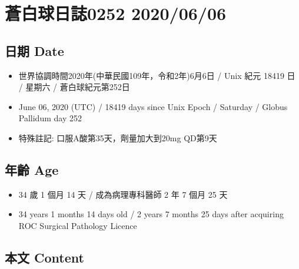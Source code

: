 \documentclass[a5paper, 11pt
]{book}
\providecommand{\tightlist}{%
  \setlength{\itemsep}{0pt}\setlength{\parskip}{0pt}}
\begin{document}
\hypertarget{ux84bcux767dux7403ux65e5ux8a8c0252-20200606}{%
\section{蒼白球日誌0252
2020/06/06}\label{ux84bcux767dux7403ux65e5ux8a8c0252-20200606}}

\hypertarget{ux65e5ux671f-date-5}{%
\subsection{日期 Date}\label{ux65e5ux671f-date-5}}

\begin{itemize}
\tightlist
\item
  世界協調時間2020年(中華民國109年，令和2年)6月6日 / Unix 紀元 18419 日
  / 星期六 / 蒼白球紀元第252日
\item
  June 06, 2020 (UTC) / 18419 days since Unix Epoch / Saturday / Globus
  Pallidum day 252
\item
  特殊註記: 口服A酸第35天，劑量加大到20mg QD第9天
\end{itemize}

\hypertarget{ux5e74ux9f61-age-5}{%
\subsection{年齡 Age}\label{ux5e74ux9f61-age-5}}

\begin{itemize}
\tightlist
\item
  34 歲 1 個月 14 天 / 成為病理專科醫師 2 年 7 個月 25 天
\item
  34 years 1 months 14 days old / 2 years 7 months 25 days after
  acquiring ROC Surgical Pathology Licence
\end{itemize}

\hypertarget{ux672cux6587-content-5}{%
\subsection{本文 Content}\label{ux672cux6587-content-5}}
\end{document}
